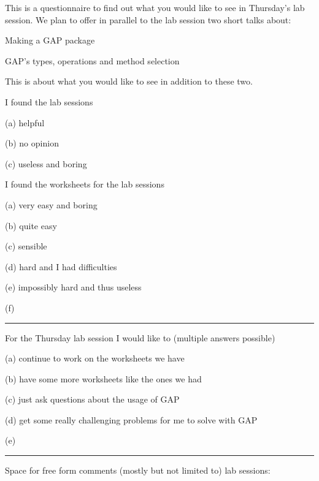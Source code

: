 \documentclass[12pt]{article}
\begin{document}
This is a questionnaire to find out what you would like to see in
Thursday's lab session. We plan to offer in parallel to the lab
session two short talks about:

\smallskip
\hspace*{1cm} Making a \textsf{GAP} package

\hspace*{1cm} \textsf{GAP}'s types, operations and method selection

\smallskip
This is about what you would like to see in addition to these two.

\bigskip

I found the lab sessions

(a) helpful

(b) no opinion

(c) useless and boring

\vspace*{1cm}
I found the worksheets for the lab sessions

(a) very easy and boring

(b) quite easy

(c) sensible

(d) hard and I had difficulties

(e) impossibly hard and thus useless

\vspace*{5mm}
(f) \rule{10cm}{1pt}

\vspace*{1cm}
For the Thursday lab session I would like to
(multiple answers possible)

(a) continue to work on the worksheets we have

(b) have some more worksheets like the ones we had

(c) just ask questions about the usage of GAP

(d) get some really challenging problems for me to solve with GAP

\vspace*{5mm}
(e) \rule{10cm}{1pt}

\vspace*{1cm}
Space for free form comments (mostly but not limited to) lab sessions:
\end{document}
